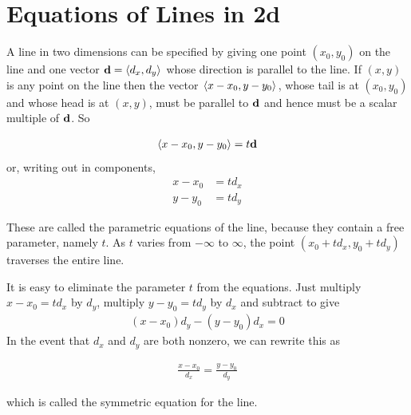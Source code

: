 \section{Equations of Lines in 2d}\label{sec lines 2d}
A line in two dimensions can be specified  by giving one point
$(x_0,y_0)$ on the line and one vector $\mathbf{d}=\left< d_x,d_y\right> $ 
whose direction is parallel to the line.
%
If $(x,y)$ is any point on the line then the vector $\left< x-x_0,y-y_0\right> $, 
whose tail is at $(x_0,y_0)$ and whose head is at $(x,y)$,  must be parallel
to $\mathbf{d}$ and hence must be a scalar multiple of $\mathbf{d}$. So
\begin{impeqn}\label{eqn par line}
\begin{align*}
   \left< x-x_0,y-y_0\right> =t \mathbf{d}
\end{align*}
or, writing out in components,
\begin{align*}
   x-x_0&=t d_x\\
   y-y_0&=t d_y
\end{align*}
\end{impeqn}\noindent
These are called the parametric equations of the line, because they contain
a free parameter, namely $t$. As $t$ varies from $-\infty$ to $\infty$,
the point $(x_0+td_x,y_0+td_y)$ traverses the entire line.

It is easy to eliminate the parameter $t$ from the equations. Just 
multiply $x-x_0=t d_x$ by $d_y$, multiply $y-y_0=t d_y$ by $d_x$
and subtract to give
\begin{align*}
(x-x_0)d_y-(y-y_0)d_x=0
\end{align*}
In the event that $d_x$ and $d_y$ are both nonzero, we can rewrite this
as
\begin{impeqn}\label{eqn symm eqn line} 
\begin{align*}
   \frac{x-x_0}{d_x}=\frac{y-y_0}{d_y}
\end{align*}
\end{impeqn}\noindent
which is called the symmetric equation for the line. 


